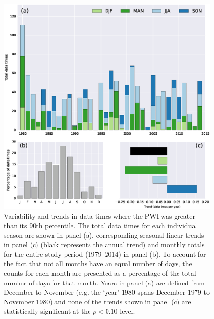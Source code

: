 \begin{figure}
\begin{center}
\includegraphics[width=0.7\columnwidth]{figures/zonalwaves/dates-summary_pwigt90pct_ERAInterim_500hPa_030day-runmean_native.eps}
\caption[Variability and trends in data times where the PWI was greater than its 90th percentile]{\label{fig:annual_distribution}
Variability and trends in data times where the PWI was greater than its 90th percentile. The total data times for each individual season are shown in panel (a), corresponding seasonal linear trends in panel (c) (black represents the annual trend) and monthly totals for the entire study period (1979--2014) in panel (b). To account for the fact that not all months have an equal number of days, the counts for each month are presented as a percentage of the total number of days for that month. Years in panel (a) are defined from December to November (e.g. the `year' 1980 spans December 1979 to November 1980) and none of the trends shown in panel (c) are statistically significant at the $p < 0.10$ level.}
\end{center}
\end{figure}

